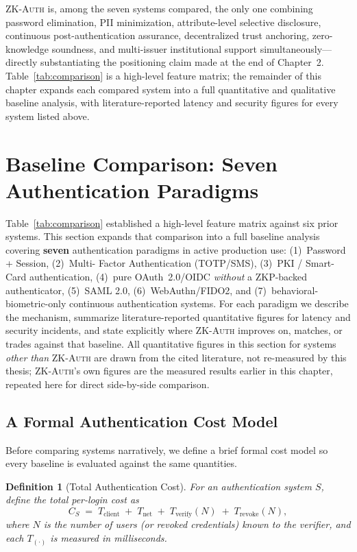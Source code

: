 \documentclass[12pt,a4paper,oneside]{report}
\newtheorem{definition}{Definition}[chapter]
\begin{document}
\textsc{ZK-Auth} is, among the seven systems compared, the only one
combining password elimination, PII minimization, attribute-level
selective disclosure, continuous post-authentication assurance,
decentralized trust anchoring, zero-knowledge soundness, and multi-issuer
institutional support simultaneously---directly substantiating the
positioning claim made at the end of Chapter~2. Table~\ref{tab:comparison}
is a high-level feature matrix; the remainder of this chapter expands each
compared system into a full quantitative and qualitative baseline analysis,
with literature-reported latency and security figures for every system listed
above.

\section{Baseline Comparison: Seven Authentication Paradigms}
\label{ch:baselines}

Table~\ref{tab:comparison} established a high-level feature
matrix against six prior systems. This section expands that comparison
into a full baseline analysis covering \textbf{seven} authentication
paradigms in active production use: (1)~Password + Session, (2)~Multi-
Factor Authentication (TOTP/SMS), (3)~PKI / Smart-Card authentication,
(4)~pure OAuth~2.0/OIDC \textit{without} a ZKP-backed authenticator,
(5)~SAML 2.0, (6)~WebAuthn/FIDO2, and (7)~behavioral-biometric-only
continuous authentication systems. For each paradigm we describe the
mechanism, summarize literature-reported quantitative figures for
latency and security incidents, and state explicitly where
\textsc{ZK-Auth} improves on, matches, or trades against that baseline.
All quantitative figures in this section for systems \textit{other than}
\textsc{ZK-Auth} are drawn from the cited literature, not re-measured by
this thesis; \textsc{ZK-Auth}'s own figures are the measured results
earlier in this chapter, repeated here for direct side-by-side comparison.

\subsection{A Formal Authentication Cost Model}
\label{sec:cost_model}

Before comparing systems narratively, we define a brief formal cost
model so every baseline is evaluated against the same quantities.

\begin{definition}[Total Authentication Cost]
For an authentication system $S$, define the total per-login cost as
\begin{equation}
C_S \;=\; T_{\text{client}} \;+\; T_{\text{net}}
\;+\; T_{\text{verify}}(N) \;+\; T_{\text{revoke}}(N),
\label{eq:totalcost}
\end{equation}
where $N$ is the number of users (or revoked credentials) known to the
verifier, and each $T_{(\cdot)}$ is measured in milliseconds.
\end{definition}
\end{document}

